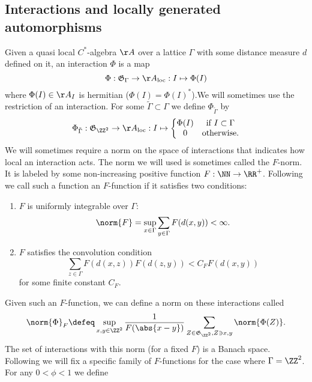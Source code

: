 \subsection{Interactions and locally generated automorphisms}
Given a quasi local $C^*$-algebra $\AA$ over a lattice $\Gamma$ with some distance measure $d$ defined on it, an interaction $\Phi$ is a map
\begin{equation}
\Phi: \mathfrak{G}_{\Gamma}\rightarrow \AA_{\text{loc}}: I \mapsto \Phi(I)
\end{equation}
where $\Phi(I)\in\AA_I$ is hermitian ($\Phi(I)=\Phi(I)^*$).We will sometimes use the restriction of an interaction. For some $\tilde\Gamma\subset\Gamma$ we define $\Phi_{\tilde\Gamma}$ by
\begin{equation}
\Phi_{\tilde\Gamma}:\mathfrak{G}_{\ZZ^2}\rightarrow \AA_{\text{loc}}:I\mapsto\left\{\begin{matrix}
\Phi(I)&\text{if }I\subset\Gamma\\0&\text{otherwise}.
\end{matrix}\right.
\end{equation}
We will sometimes require a norm on the space of interactions that indicates how local an interaction acts. The norm we will used is sometimes called the $F$-norm. It is labeled by some non-increasing positive function $F:\NN\rightarrow \RR^+$. Following \cite{nachtergaele2019quasi} we call such a function an $F$-function if it satisfies two conditions:
\begin{enumerate}
	\item $F$ is uniformly integrable over $\Gamma$:
	\begin{equation}\label{eq:F_Is_Uniformly_Integrable_Over_Gamma}
	\norm{F}=\sup_{x\in\Gamma}\sum_{y\in\Gamma}F(d(x,y))<\infty.
	\end{equation}
	\item $F$ satisfies the convolution condition
	\begin{equation}
	\sum_{z\in\Gamma}F(d(x,z))F(d(z,y))< C_F F(d(x,y))
	\end{equation}
	for some finite constant $C_F$.
\end{enumerate}
Given such an $F$-function, we can define a norm on these interactions called 
\begin{equation}
\norm{\Phi}_F\defeq \sup_{x,y\in\ZZ^2}\frac{1}{F(\abs{x-y})}\sum_{Z\in\mathfrak{G}_{\ZZ^2},Z\ni x,y}\norm{\Phi(Z)}.
\end{equation}
The set of interactions with this norm (for a fixed $F$) is a Banach space. Following \cite{Ogata2d} we will fix a specific family of $F$-functions for the case where $\Gamma=\ZZ^2$. For any $0<\phi<1$ we define
